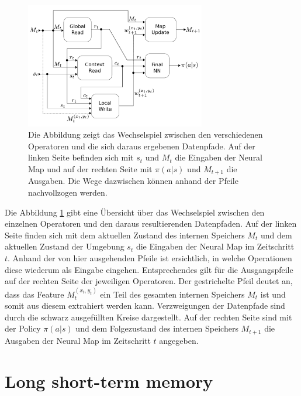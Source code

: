 \begin{figure}[ht!]
  \centering
  \includegraphics[keepaspectratio,width=0.7\textwidth]{abbildungen/neural_map.pdf}
  \caption{Die Abbildung zeigt das Wechselspiel zwischen den verschiedenen Operatoren und die sich daraus ergebenen Datenpfade. Auf der linken Seite befinden sich mit $s_t$ und $M_t$ die Eingaben der Neural Map und auf der rechten Seite mit $\pi(a|s)$ und $M_{t+1}$ die Ausgaben. Die Wege dazwischen können anhand der Pfeile nachvollzogen werden.}
  \label{fig_neural_map}
\end{figure}


Die Abbildung \ref{fig_neural_map} gibt eine Übersicht über das Wechselspiel zwischen den einzelnen Operatoren und den daraus resultierenden Datenpfaden. Auf der linken Seite finden sich mit dem aktuellen Zustand des internen Speichers $M_t$ und dem aktuellen Zustand der Umgebung $s_t$ die Eingaben der Neural Map im Zeitschritt $t$. Anhand der von hier ausgehenden Pfeile ist ersichtlich, in welche Operationen diese wiederum als Eingabe eingehen. Entsprechendes gilt für die Ausgangspfeile auf der rechten Seite der jeweiligen Operatoren. Der gestrichelte Pfeil deutet an, dass das Feature $M_t^{(x_t,y_t)}$ ein Teil des gesamten internen Speichers $M_t$ ist und somit aus diesem extrahiert werden kann. Verzweigungen der Datenpfade sind durch die schwarz ausgefüllten Kreise dargestellt. Auf der rechten Seite sind mit der Policy $\pi(a|s)$ und dem Folgezustand des internen Speichers $M_{t+1}$ die Ausgaben der Neural Map im Zeitschritt $t$ angegeben.


\section{Long short-term memory}
\label{sec_lstm}

